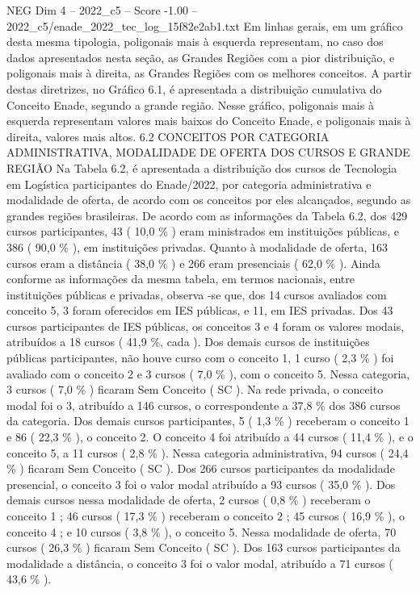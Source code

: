 \begin{textsample}{NEG Dim 4 – 2022\_c5 – Score -1.00 – 2022\_c5/enade\_2022\_tec\_log\_15f82e2ab1.txt}
Em linhas gerais, em um gráfico desta mesma tipologia, poligonais mais à esquerda representam, no caso dos dados apresentados nesta seção, as Grandes Regiões com a pior distribuição, e poligonais mais à direita, as Grandes Regiões com os melhores conceitos.
A partir destas diretrizes, no Gráfico 6.1, é apresentada a distribuição cumulativa do Conceito Enade, segundo a grande região.
Nesse gráfico, poligonais mais à esquerda representam valores mais baixos do Conceito Enade, e poligonais mais à direita, valores mais altos. 6.2 CONCEITOS POR CATEGORIA ADMINISTRATIVA, MODALIDADE DE OFERTA DOS CURSOS E GRANDE REGIÃO Na Tabela 6.2, é apresentada a distribuição dos cursos de Tecnologia em Logística participantes do Enade/2022, por categoria administrativa e modalidade de oferta, de acordo com os conceitos por eles alcançados, segundo as grandes regiões brasileiras.
De acordo com as informações da Tabela 6.2, dos 429 cursos participantes, 43 ( 10,0 \% ) eram ministrados em instituições públicas, e 386 ( 90,0 \% ), em instituições privadas.
Quanto à modalidade de oferta, 163 cursos eram a distância ( 38,0 \% ) e 266 eram presenciais ( 62,0 \% ).
Ainda conforme as informações da mesma tabela, em termos nacionais, entre instituições públicas e privadas, observa -se que, dos 14 cursos avaliados com conceito 5, 3 foram oferecidos em IES públicas, e 11, em IES privadas.
Dos 43 cursos participantes de IES públicas, os conceitos 3 e 4 foram os valores modais, atribuídos a 18 cursos ( 41,9 \%, cada ).
Dos demais cursos de instituições públicas participantes, não houve curso com o conceito 1, 1 curso ( 2,3 \% ) foi avaliado com o conceito 2 e 3 cursos ( 7,0 \% ), com o conceito 5.
Nessa categoria, 3 cursos ( 7,0 \% ) ficaram Sem Conceito ( SC ).
Na rede privada, o conceito modal foi o 3, atribuído a 146 cursos, o correspondente a 37,8 \% dos 386 cursos da categoria.
Dos demais cursos participantes, 5 ( 1,3 \% ) receberam o conceito 1 e 86 ( 22,3 \% ), o conceito 2.
O conceito 4 foi atribuído a 44 cursos ( 11,4 \% ), e o conceito 5, a 11 cursos ( 2,8 \% ).
Nessa categoria administrativa, 94 cursos ( 24,4 \% ) ficaram Sem Conceito ( SC ).
Dos 266 cursos participantes da modalidade presencial, o conceito 3 foi o valor modal atribuído a 93 cursos ( 35,0 \% ).
Dos demais cursos nessa modalidade de oferta, 2 cursos ( 0,8 \% ) receberam o conceito 1 ; 46 cursos ( 17,3 \% ) receberam o conceito 2 ; 45 cursos ( 16,9 \% ), o conceito 4 ; e 10 cursos ( 3,8 \% ), o conceito 5.
Nessa modalidade de oferta, 70 cursos ( 26,3 \% ) ficaram Sem Conceito ( SC ).
Dos 163 cursos participantes da modalidade a distância, o conceito 3 foi o valor modal, atribuído a 71 cursos ( 43,6 \% ).

\end{textsample}
